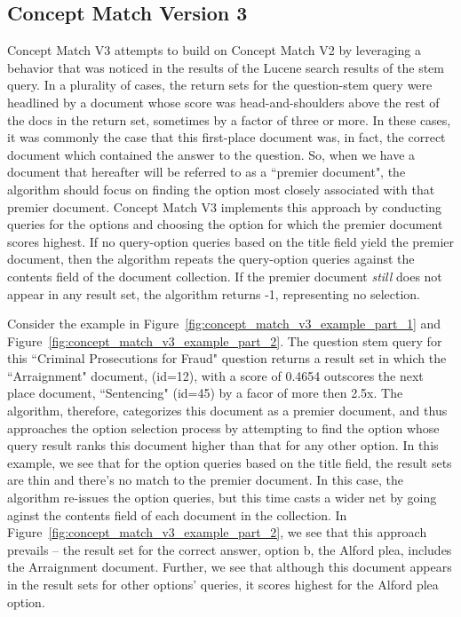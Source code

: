 \subsection{Concept Match Version 3}

Concept Match V3 attempts to build on Concept Match V2 by leveraging a behavior that was noticed in the results of the Lucene search results of the stem query.  In a plurality of cases, the return sets for the question-stem query were headlined by a document whose score was head-and-shoulders above the rest of the docs in the return set, sometimes by a factor of three or more.  In these cases, it was commonly the case that this first-place document was, in fact, the correct document which contained the answer to the question.  So, when we have a document that hereafter will be referred to as a  ``premier document", the algorithm should focus on finding the option most closely associated with that premier document.  Concept Match V3 implements this approach by conducting queries for the options and choosing the option for which the premier document scores highest.  If no query-option queries based on the title field yield the premier document, then the algorithm repeats the query-option queries against the contents field of the document collection.  If the premier document \emph{still} does not appear in any result set, the algorithm returns -1, representing no selection.

Consider the example in Figure~\ref{fig:concept_match_v3_example_part_1} and Figure~\ref{fig:concept_match_v3_example_part_2}.  The question stem query for this ``Criminal Prosecutions for Fraud" question returns a result set in which the ``Arraignment" document, (id=12), with a score of 0.4654 outscores the next place document, ``Sentencing" (id=45) by a facor of more then 2.5x.  The algorithm, therefore,  categorizes this document as a premier document, and thus approaches the option selection process by attempting to find the option whose query result ranks this document higher than that for any other option.  In this example, we see that for the option queries based on the title field, the result sets are thin and there's no match to the premier document.  In this case, the algorithm re-issues the option queries, but this time casts a wider net by going aginst the contents field of each document in the collection.  In Figure~\ref{fig:concept_match_v3_example_part_2}, we see that this approach prevails -- the result set for the correct answer, option b, the Alford plea, includes the Arraignment document.  Further, we see that although this document appears in the result sets for other options' queries, it scores highest for the Alford plea option.

